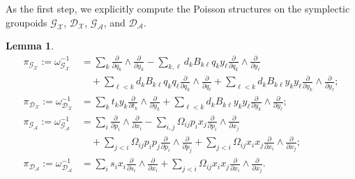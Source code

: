 \documentclass{amsart}
\newtheorem{lemma}[theorem]{Lemma}
\numberwithin{equation}{section}
\newcommand{\cA}{\mathcal{A}}
\newcommand{\cG}{\mathcal{G}}
\renewcommand{\cD}{\mathcal{D}}
\newcommand{\cX}{\mathcal{X}}
\begin{document}
As the first step, we explicitly compute the Poisson structures on the symplectic groupoids $\cG_\cX$, $\cD_\cX$, $\cG_\cA$, and $\cD_\cA$.
\begin{lemma}
  \label{le:groupoid Poisson structures}
  \begin{align}
    \pi_{\cG_\cX}:=\omega_{\cG_\cX}^{-1}&=\sum_{k} \frac{\partial}{\partial q_k} \wedge \frac{\partial}{\partial y_k} - \sum_{k, \ell} d_kB_{k\ell}q_k y_\ell \frac{\partial}{\partial q_k} \wedge \frac{\partial}{\partial y_\ell}\\
    \nonumber &\quad+\sum_{\ell < k} d_kB_{k\ell}q_kq_\ell \frac{\partial}{\partial q_k} \wedge \frac{\partial}{\partial q_\ell}
		    +\sum_{\ell < k} d_kB_{k\ell}y_ky_\ell \frac{\partial}{\partial y_k} \wedge \frac{\partial}{\partial y_\ell};\\
    \pi_{\cD_\cX}:=\omega_{\cD_\cX}^{-1}&=\sum_{k} t_ky_k\frac{\partial}{\partial t_k} \wedge \frac{\partial}{\partial y_k}+\sum_{\ell < k} d_kB_{k\ell}y_ky_\ell \frac{\partial}{\partial y_k} \wedge \frac{\partial}{\partial y_\ell};\\
    \pi_{\cG_\cA}:=\omega_{\cG_\cA}^{-1}&=\sum_{i} \frac{\partial}{\partial p_i} \wedge \frac{\partial}{\partial x_i} - \sum_{i, j} \Omega_{ij}p_i x_j \frac{\partial}{\partial p_i} \wedge \frac{\partial}{\partial x_j}\\
    \nonumber &\quad+\sum_{j < i} \Omega_{ij}p_ip_j \frac{\partial}{\partial p_i} \wedge \frac{\partial}{\partial p_j}
		    +\sum_{j < i} \Omega_{ij}x_ix_j \frac{\partial}{\partial x_i} \wedge \frac{\partial}{\partial x_j};\\
    \pi_{\cD_\cA}:=\omega_{\cD_\cA}^{-1}&=\sum_{i} s_ix_i\frac{\partial}{\partial s_i} \wedge \frac{\partial}{\partial x_i}+\sum_{j < i} \Omega_{ij}x_ix_j \frac{\partial}{\partial x_i} \wedge \frac{\partial}{\partial x_j}.
  \end{align}
\end{lemma}
\end{document}
